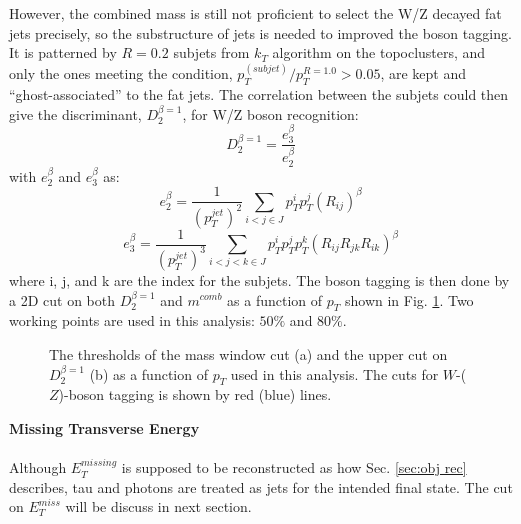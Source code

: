 \noindent
However, the combined mass is still not proficient to select the W/Z decayed fat jets precisely, so the substructure of jets is needed to improved the boson tagging. It is patterned by  $R=0.2$ subjets from $k_{T}$ algorithm on the topoclusters, and only the ones meeting the condition, $p_{T}^(subjet)/p_{T}^{R=1.0}>0.05$, are kept and ``ghost-associated'' to the fat jets. The correlation between the subjets could then give the discriminant, $D^{\beta =1}_{2}$, for W/Z boson recognition:
\begin{equation}
D^{\beta =1}_{2} = \frac{e^{\beta}_{3}}{e^{\beta}_2} 
\end{equation}
with $e^{\beta}_{2}$ and $e^{\beta}_{3}$ as:
\begin{equation}
e^{\beta}_{2} = \frac{1}{(p_{T}^{jet})^2}\displaystyle\sum\limits_{i<j\in J}p_{T}^{i}p_{T}^j(R_{ij})^{\beta}
\end{equation}
\begin{equation}
e^{\beta}_{3} = \frac{1}{(p_{T}^{jet})^3}\displaystyle\sum\limits_{i<j<k\in J}p_{T}^{i}p_{T}^{j}p_{T}^{k}(R_{ij}R_{jk}R_{ik})^{\beta}
\end{equation}
where i, j, and k are the index for the subjets. The boson tagging is then done by a 2D cut on both $D^{\beta =1}_{2}$ and $m^{comb}$ as a function of $p_{T}$ shown in Fig. \ref{Fig:newWZtaggerWP}. Two working points are used in this analysis: $50\%$ and $80\%$. 
\begin{figure}[ht]
	\begin{center}
		\caption{The thresholds of the mass window cut (a) and the upper cut on $D^{\beta =1}_2$ (b) as a function of $p_{T}$ used in this analysis. The cuts  for $W$-($Z$)-boson tagging is shown by red (blue) lines.}
		\label{Fig:newWZtaggerWP}
	\end{center}
\end{figure}
\noindent
{\bf Missing Transverse Energy}
\\
\\Although $E^{missing}_{T}$ is supposed to be reconstructed as how Sec. \ref{sec:obj rec} describes, tau and photons are treated as jets for the intended final state. The cut on $E^{miss}_{T}$ will be discuss in next section.   
